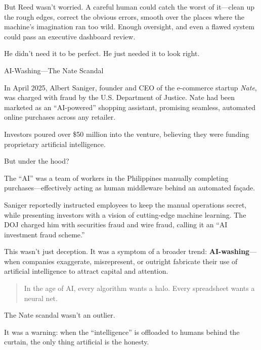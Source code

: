 But Reed wasn’t worried. A careful human could catch the worst of it—clean up the rough edges, correct the obvious errors, smooth over the places where the machine’s imagination ran too wild. Enough oversight, and even a flawed system could pass an executive dashboard review.

He didn’t need it to be perfect.  
He just needed it to look right.


\medskip

\begin{HistoricalSidebar}{AI-Washing—The Nate Scandal}

In April 2025, Albert Saniger, founder and CEO of the e-commerce startup \textit{Nate}, was charged with fraud by the U.S. Department of Justice. Nate had been marketed as an “AI-powered” shopping assistant, promising seamless, automated online purchases across any retailer.

\medskip

Investors poured over \$50 million into the venture, believing they were funding proprietary artificial intelligence.

\medskip

But under the hood?

\medskip

The “AI” was a team of workers in the Philippines manually completing purchases—effectively acting as human middleware behind an automated façade.

\medskip

Saniger reportedly instructed employees to keep the manual operations secret, while presenting investors with a vision of cutting-edge machine learning. The DOJ charged him with securities fraud and wire fraud, calling it an “AI investment fraud scheme.”

\medskip

This wasn’t just deception. It was a symptom of a broader trend:  
\textbf{AI-washing}—when companies exaggerate, misrepresent, or outright fabricate their use of artificial intelligence to attract capital and attention.

\begin{quote}
In the age of AI\texttrademark{}, every algorithm wants a halo.  
Every spreadsheet wants a neural net.
\end{quote}

The Nate scandal wasn’t an outlier.  

\medskip

It was a warning: when the “intelligence” is offloaded to humans behind the curtain, the only thing artificial is the honesty.

\end{HistoricalSidebar}

